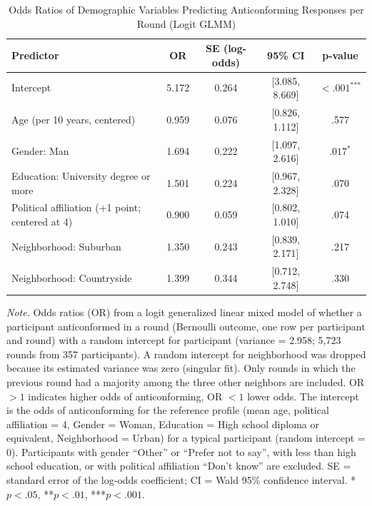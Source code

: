 \begin{table}[H]
\centering
\caption{Odds Ratios of Demographic Variables Predicting Anticonforming Responses per Round (Logit GLMM)}
\label{tab:or_antic_demog_round}
\begingroup
\footnotesize
\renewcommand{\arraystretch}{0.90}

\begin{tabularx}{\linewidth}{Xcccc}
\toprule
\textbf{Predictor} & \textbf{OR} & \textbf{SE (log-odds)} & \textbf{95\% CI} & \textbf{p-value} \\
\midrule
Intercept & 5.172 & 0.264 & [3.085, 8.669] & $< .001^{\text{***}}$ \\
Age (per 10 years, centered) & 0.959 & 0.076 & [0.826, 1.112] & .577 \\
Gender: Man & 1.694 & 0.222 & [1.097, 2.616] & $.017^{\text{*}}$ \\
Education: University degree or more & 1.501 & 0.224 & [0.967, 2.328] & .070 \\
Political affiliation (+1 point; centered at 4) & 0.900 & 0.059 & [0.802, 1.010] & .074 \\
Neighborhood: Suburban & 1.350 & 0.243 & [0.839, 2.171] & .217 \\
Neighborhood: Countryside & 1.399 & 0.344 & [0.712, 2.748] & .330 \\
\bottomrule
\end{tabularx}

\vspace{0.6em}
{\footnotesize
\setlength{\baselineskip}{12pt}
\textit{Note.} Odds ratios (OR) from a logit generalized linear mixed model of whether a participant anticonformed in a round (Bernoulli outcome, one row per participant and round) with a random intercept for participant (variance = 2.958; 5,723 rounds from 357 participants). A random intercept for neighborhood was dropped because its estimated variance was zero (singular fit). Only rounds in which the previous round had a majority among the three other neighbors are included. OR $> 1$ indicates higher odds of anticonforming, OR $< 1$ lower odds. The intercept is the odds of anticonforming for the reference profile (mean age, political affiliation = 4, Gender = Woman, Education = High school diploma or equivalent, Neighborhood = Urban) for a typical participant (random intercept = 0). Participants with gender ``Other'' or ``Prefer not to say'', with less than high school education, or with political affiliation ``Don't know'' are excluded. SE = standard error of the log-odds coefficient; CI = Wald 95\% confidence interval. *$p < .05$, **$p < .01$, ***$p < .001$.
\par}
\endgroup
\end{table}

